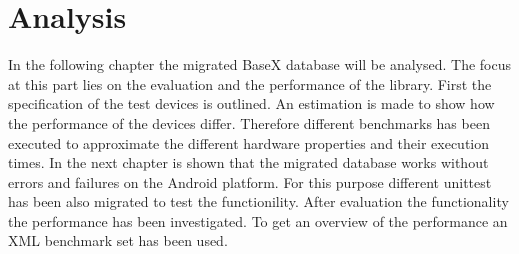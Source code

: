 \chapter{Analysis}
\label{cha:analysis}
In the following chapter the migrated BaseX database will be analysed.
The focus at this part lies on the evaluation and the performance of the library.
First the specification of the test devices is outlined.
An estimation is made to show how the performance of the devices differ.
Therefore different benchmarks has been executed to approximate the different hardware properties and their execution times.
In the next chapter is shown that the migrated database works without errors and failures on the Android platform.
For this purpose different unittest has been also migrated to test the functionility.
After evaluation the functionality the performance has been investigated.
To get an overview of the performance an XML benchmark set has been used.
